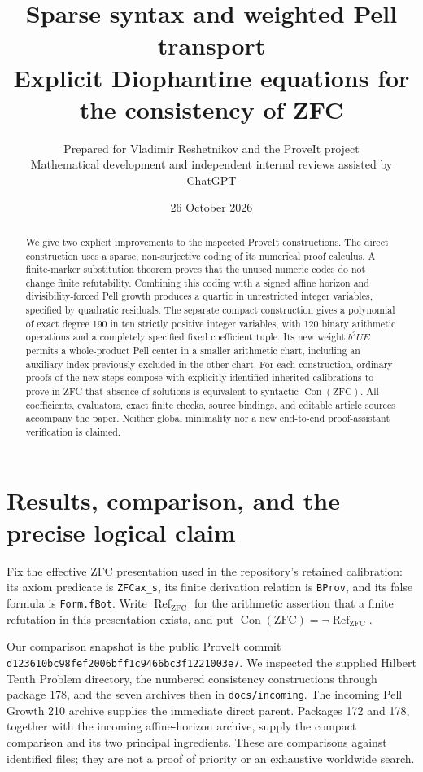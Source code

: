 \documentclass[11pt,letterpaper]{article}
\title{Sparse syntax and weighted Pell transport\\
\large Explicit Diophantine equations for the consistency of ZFC}
\author{Prepared for Vladimir Reshetnikov and the ProveIt project\\
\small Mathematical development and independent internal reviews assisted by ChatGPT}
\date{26 October 2026}
\theoremstyle{remark}\newtheorem{remark}[theorem]{Remark}
\newcommand{\Con}{\operatorname{Con}}\newcommand{\RefZ}{\operatorname{Ref}}
\newcommand{\code}[1]{\nolinkurl{#1}}
\begin{document}
\maketitle
\begin{abstract}
We give two explicit improvements to the inspected ProveIt constructions.
The direct construction uses a sparse, non-surjective coding of its numerical
proof calculus. A finite-marker substitution theorem proves that the unused
numeric codes do not change finite refutability. Combining this coding with
a signed affine horizon and divisibility-forced Pell growth produces a
quartic in \DirectVariables{} unrestricted integer variables, specified by
\DirectRows{} quadratic residuals. The separate compact construction gives a
polynomial of exact degree 190 in ten strictly positive integer variables,
with 120 binary arithmetic operations and a completely specified fixed
coefficient tuple. Its new weight $b^2UE$ permits a whole-product Pell center
in a smaller arithmetic chart, including an auxiliary index previously
excluded in the other chart. For each construction, ordinary proofs of the
new steps compose with explicitly identified inherited calibrations to prove
in ZFC that absence of solutions is equivalent to syntactic $\Con(\mathrm{ZFC})$.
All coefficients, evaluators, exact finite checks, source bindings, and
editable article sources accompany the paper. Neither global minimality nor
a new end-to-end proof-assistant verification is claimed.
\end{abstract}

\tableofcontents
\newpage

\section{Results, comparison, and the precise logical claim}

Fix the effective ZFC presentation used in the repository's retained
calibration: its axiom predicate is \code{ZFCax_s}, its finite derivation
relation is \code{BProv}, and its false formula is \code{Form.fBot}.
Write $\RefZ_{\mathrm{ZFC}}$ for the arithmetic assertion that a finite
refutation in this presentation exists, and put
$\Con(\mathrm{ZFC})=\neg\RefZ_{\mathrm{ZFC}}$.

Our comparison snapshot is the public ProveIt commit
\code{d123610bc98fef2006bff1c9466bc3f1221003e7}. We inspected the supplied
Hilbert Tenth Problem directory, the numbered consistency constructions
through package 178, and the seven archives then in \code{docs/incoming}.
The incoming Pell Growth 210 archive supplies the immediate direct parent\cite{growth210}.
Packages 172 and 178, together with the incoming affine-horizon archive,
supply the compact comparison and its two principal ingredients\cite{free172,center178}.
These are comparisons against identified files; they are not a proof of
priority or an exhaustive worldwide search.
\end{document}
